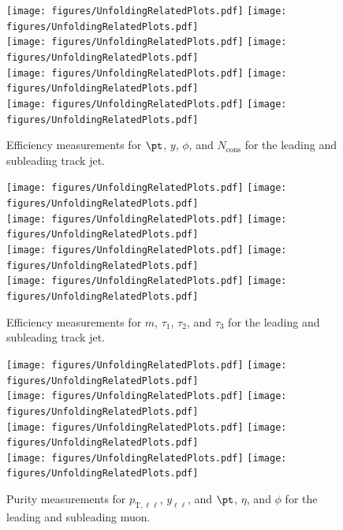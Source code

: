 \begin{figure}[h!]
  \centering
  \texttt{[image: figures/UnfoldingRelatedPlots.pdf]}
  \texttt{[image: figures/UnfoldingRelatedPlots.pdf]} \\
  \texttt{[image: figures/UnfoldingRelatedPlots.pdf]}
  \texttt{[image: figures/UnfoldingRelatedPlots.pdf]} \\
  \texttt{[image: figures/UnfoldingRelatedPlots.pdf]}
  \texttt{[image: figures/UnfoldingRelatedPlots.pdf]} \\
  \texttt{[image: figures/UnfoldingRelatedPlots.pdf]}
  \texttt{[image: figures/UnfoldingRelatedPlots.pdf]}
  \caption{Efficiency measurements for $\pt$, $y$, $\phi$, and $N_{\text{cons}}$ for the leading and subleading track jet.}
  \label{fig:EffTJ1}
\end{figure}

\begin{figure}[h!]
  \centering
  \texttt{[image: figures/UnfoldingRelatedPlots.pdf]}
  \texttt{[image: figures/UnfoldingRelatedPlots.pdf]} \\
  \texttt{[image: figures/UnfoldingRelatedPlots.pdf]}
  \texttt{[image: figures/UnfoldingRelatedPlots.pdf]} \\
  \texttt{[image: figures/UnfoldingRelatedPlots.pdf]}
  \texttt{[image: figures/UnfoldingRelatedPlots.pdf]} \\
  \texttt{[image: figures/UnfoldingRelatedPlots.pdf]}
  \texttt{[image: figures/UnfoldingRelatedPlots.pdf]}
  \caption{Efficiency measurements for $m$, $\tau_1$, $\tau_2$, and $\tau_3$ for the leading and subleading track jet.}
  \label{fig:EffTJ2}
\end{figure}

\begin{figure}[h!]
  \centering
  \texttt{[image: figures/UnfoldingRelatedPlots.pdf]}
  \texttt{[image: figures/UnfoldingRelatedPlots.pdf]} \\
  \texttt{[image: figures/UnfoldingRelatedPlots.pdf]}
  \texttt{[image: figures/UnfoldingRelatedPlots.pdf]} \\
  \texttt{[image: figures/UnfoldingRelatedPlots.pdf]}
  \texttt{[image: figures/UnfoldingRelatedPlots.pdf]} \\
  \texttt{[image: figures/UnfoldingRelatedPlots.pdf]}
  \texttt{[image: figures/UnfoldingRelatedPlots.pdf]}
  \caption{Purity measurements for $p_{\text{T},\ell\ell}$, $y_{\ell\ell}$, and $\pt$, $\eta$, and $\phi$ for the leading and subleading muon.}
  \label{fig:PurDilep}
\end{figure}

